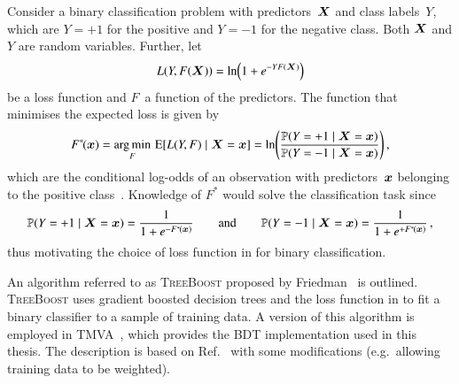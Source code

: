 Consider a binary classification problem with predictors~$\bm{X}$ and class
labels~$Y$, which are $Y = +1$ for the positive and $Y = -1$ for the negative
class. Both $\bm{X}$ and $Y$ are random variables. Further, let
\begin{align}
  L(Y, F(\bm{X})) = \ln\mathopen{}\left(
  1 + e^{-Y F(\bm{X})}
  \right)\mathclose{}
  \label{eq:loss_gradboost}
\end{align}
be a loss function and $F$~a function of the predictors. The function that
minimises the expected loss is given by
\begin{align*}
  F^{*\!}(\bm{x})
  = \operatorname*{arg\,min}_F \, \operatorname{E}[ L(Y, F) \mid \bm{X} = \bm{x} ]
  = \ln\mathopen{}\left(
  \frac{
  \mathbb{P}(Y = +1 \mid \bm{X} = \bm{x})
  }{
  \mathbb{P}(Y = -1 \mid \bm{X} = \bm{x})
  }
  \right)\mathclose{} \,\text{,}
\end{align*}
which are the conditional log-odds of an observation with predictors~$\bm{x}$
belonging to the positive class~\cite{Friedman:2000}. Knowledge of $F^{*\!}$
would solve the classification task since
\begin{align}
  \mathbb{P}(Y = +1 \mid \bm{X} = \bm{x}) = \frac{1}{1 + e^{-F^{*\!}(\bm{x})}}
  \qquad \text{and} \qquad
  \mathbb{P}(Y = -1 \mid \bm{X} = \bm{x}) = \frac{1}{1 + e^{+F^{*\!}(\bm{x})}} \,\text{,}
  \label{eq:gradboost_probas}
\end{align}
thus motivating the choice of loss function in  for
binary classification.




An algorithm referred to as \textsc{TreeBoost} proposed by
Friedman~\cite{Friedman:2001wbq} is outlined. \textsc{TreeBoost} uses gradient
boosted decision trees and the loss function in  to fit
a binary classifier to a sample of training data. A version of this algorithm is
employed in \textsc{TMVA}~\cite{TMVA}, which provides the BDT implementation
used in this thesis. The description is based on Ref.~\cite{Friedman:2001wbq}
with some modifications (e.g.\ allowing training data to be weighted).

